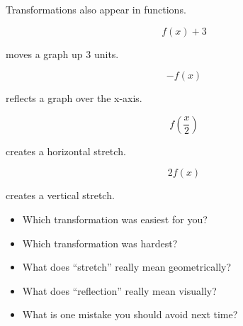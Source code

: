 \documentclass[11pt]{article}
\begin{document}
\vspace{0.5cm}


\begin{tcolorbox}[
colback=cyan!5,
colframe=cyan!60!black,
title=\Large D. Connection to Functions
]

Transformations also appear in functions.

\vspace{0.3cm}

\[
f(x)+3
\]

moves a graph up 3 units.

\vspace{0.3cm}

\[
-f(x)
\]

reflects a graph over the x-axis.

\vspace{0.3cm}

\[
f\left(\frac{x}{2}\right)
\]

creates a horizontal stretch.

\vspace{0.3cm}

\[
2f(x)
\]

creates a vertical stretch.

\end{tcolorbox}

\vspace{0.5cm}


\begin{tcolorbox}[
colback=yellow!5,
colframe=orange,
title=\Large Self Reflection
]

\begin{itemize}

\item Which transformation was easiest for you?

\vspace{0.5cm}

\item Which transformation was hardest?

\vspace{0.5cm}

\item What does ``stretch'' really mean geometrically?

\vspace{0.5cm}

\item What does ``reflection'' really mean visually?

\vspace{0.5cm}

\item What is one mistake you should avoid next time?

\vspace{0.5cm}

\end{itemize}

\end{tcolorbox}
\end{document}
